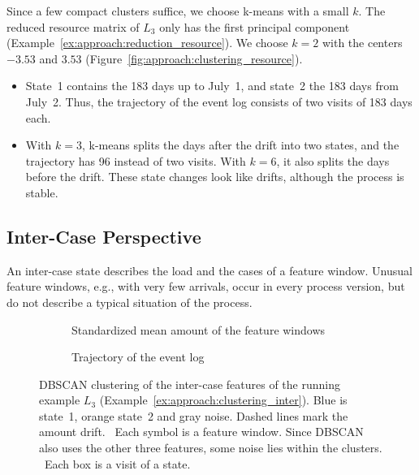 \begin{example}
	\label{ex:approach:clustering_resource}
	Since a few compact clusters suffice, we choose k-means with a small $k$. The reduced resource matrix of $L_3$ only has the first principal component (Example~\ref{ex:approach:reduction_resource}). We choose $k = 2$ with the centers $-3.53$ and $3.53$ (Figure~\ref{fig:approach:clustering_resource}).
	\begin{itemize}
		\item State~1 contains the 183 days up to July~1, and state~2 the 183 days from July~2. Thus, the trajectory of the event log consists of two visits of 183 days each.

		\item With $k = 3$, k-means splits the days after the drift into two states, and the trajectory has 96 instead of two visits. With $k = 6$, it also splits the days before the drift. These state changes look like drifts, although the process is stable.
	\end{itemize}
\end{example}

\subsection{Inter-Case Perspective}
\label{sec:approach:clustering:inter}
An inter-case state describes the load and the cases of a feature window. Unusual feature windows, e.g., with very few arrivals, occur in every process version, but do not describe a typical situation of the process.

\begin{figure}[tb]
	\centering
	\begin{subfigure}{\textwidth}
		\centering
		
		\caption{Standardized mean amount of the feature windows}
		\label{fig:approach:states_inter}
	\end{subfigure}

	\medskip
	\begin{subfigure}{\textwidth}
		\centering
		
		\caption{Trajectory of the event log}
		\label{fig:approach:trajectories_inter}
	\end{subfigure}
	\caption[Inter-case clustering of the running example]{%
		DBSCAN clustering of the inter-case features of the running example $L_3$ (Example~\ref{ex:approach:clustering_inter}). Blue is state~1, orange state~2 and gray noise. Dashed lines mark the amount drift.
		~Each symbol is a feature window. Since DBSCAN also uses the other three features, some noise lies within the clusters.
		~Each box is a visit of a state.}
	\label{fig:approach:clustering_inter}
\end{figure}

